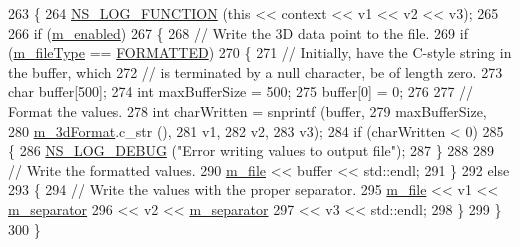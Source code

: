 \begin{DoxyCode}
263 \{
264   \hyperlink{log-macros-disabled_8h_a90b90d5bad1f39cb1b64923ea94c0761}{NS\_LOG\_FUNCTION} (\textcolor{keyword}{this} << context << v1 << v2 << v3);
265 
266   \textcolor{keywordflow}{if} (\hyperlink{classns3_1_1DataCollectionObject_a3e8b0578f03044b1db4811ecff2be7ea}{m\_enabled})
267     \{
268       \textcolor{comment}{// Write the 3D data point to the file.}
269       \textcolor{keywordflow}{if} (\hyperlink{classns3_1_1FileAggregator_aa2a8abfe3082a802dc6705e701f73e9e}{m\_fileType} == \hyperlink{classns3_1_1FileAggregator_aedb3108205a498f7ac0c564508067e2da7e34fea5d3f680d09518ee58ce4711f0}{FORMATTED})
270         \{
271           \textcolor{comment}{// Initially, have the C-style string in the buffer, which}
272           \textcolor{comment}{// is terminated by a null character, be of length zero.}
273           \textcolor{keywordtype}{char} buffer[500];
274           \textcolor{keywordtype}{int} maxBufferSize = 500;
275           buffer[0] = 0;
276 
277           \textcolor{comment}{// Format the values.}
278           \textcolor{keywordtype}{int} charWritten = snprintf (buffer,
279                                       maxBufferSize,
280                                       \hyperlink{classns3_1_1FileAggregator_ab86ae12895719cfb867e102706858cec}{m\_3dFormat}.c\_str (),
281                                       v1,
282                                       v2,
283                                       v3);
284           \textcolor{keywordflow}{if} (charWritten < 0)
285             \{
286               \hyperlink{group__logging_ga413f1886406d49f59a6a0a89b77b4d0a}{NS\_LOG\_DEBUG} (\textcolor{stringliteral}{"Error writing values to output file"});
287             \}
288 
289           \textcolor{comment}{// Write the formatted values.}
290           \hyperlink{classns3_1_1FileAggregator_a756affa0d614724be513ceedcff62ac0}{m\_file} << buffer << std::endl;
291         \}
292       \textcolor{keywordflow}{else}
293         \{
294           \textcolor{comment}{// Write the values with the proper separator.}
295           \hyperlink{classns3_1_1FileAggregator_a756affa0d614724be513ceedcff62ac0}{m\_file} << v1 << \hyperlink{classns3_1_1FileAggregator_a1f74a4c07f663d535da56dfb70414a15}{m\_separator}
296                  << v2 << \hyperlink{classns3_1_1FileAggregator_a1f74a4c07f663d535da56dfb70414a15}{m\_separator}
297                  << v3 << std::endl;
298         \}
299     \}
300 \}
\end{DoxyCode}
